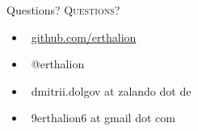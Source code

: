 \documentclass[usenames,dvipsnames, 18pt, compress, aspectratio=169]{beamer}
\def\twitter{{\FA \faTwitter}}
\def\github{{\FA \faGithub}}
\def\email{{\FA \faEnvelope}}
\begin{document}




\fontsize{18pt}{18}\selectfont
\begin{frame}
  \vspace*{2.5cm}
  \begin{minipage}[b][\paperheight]{\textwidth}
  \begin{center}

      \linespread{1.0}%
      \if@noSmallCapitals%
        Questions?
      \else%
        \scshape{\color{black} Questions?}%
      \fi%
      \vspace*{0.3em}

      \fontsize{13pt}{14}\selectfont
        \begin{itemize}[label={}]
            \item {\color{black} \github\ \href{github.com/erthalion}
                                               {\color{black}github.com/erthalion}}
            \item {\color{black} \twitter\ @erthalion}
            \item {\color{black} \email\ dmitrii.dolgov at zalando dot de}
            \item {\color{black} \email\ 9erthalion6 at gmail dot com}
        \end{itemize}
      \vspace*{2.5em}%

    \vfill
    \vspace*{2em}
  \end{center}
  \end{minipage}

\end{frame}
\end{document}
